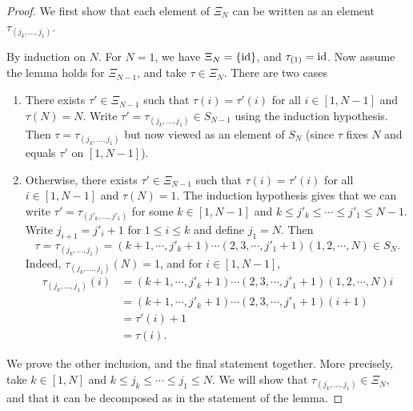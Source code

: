 \begin{proof}
	We first show that each element of $\Xi_N$ can be written as an element $\tau_{(j_k, \dots, j_1)}$.

	By induction on $N$. For $N = 1$, we have $\Xi_N = \{\operatorname{id}\}$, and $\tau_{(1)} = \operatorname{id}$.
	Now assume the lemma holds for $\Xi_{N-1}$, and take $\tau \in \Xi_N$. There are two
	cases
	\begin{enumerate}
		\item There exists $\tau' \in \Xi_{N-1}$ such that $\tau(i) = \tau'(i)$ for all $i\in [1,
				      N-1]$ and $\tau(N) = N$. Write $\tau' = \tau_{(j_k, \dots, j_1)} \in S_{N-1}$ using the
		      induction hypothesis. Then $\tau = \tau_{(j_k, \dots, j_1)}$ but now viewed as an
		      element of $S_N$ (since $\tau$ fixes $N$ and equals $\tau'$ on $[1, N-1]$).
		\item Otherwise, there exists $\tau' \in \Xi_{N-1}$ such that $\tau(i) = \tau'(i)$ for all
		      $i\in [1, N-1]$ and $\tau(N) = 1$. The induction hypothesis gives that we can write
		      $\tau' = \tau_{(j'_k, \dots, j'_1)}$ for some $k \in [1, N - 1]$ and $k \leq j'_k \leq
			      \cdots \leq j'_1 \leq N - 1$. Write $j_{i+1} = j'_i + 1$ for $1 \leq i \leq k$ and
		      define $j_1 = N$. Then
		      \begin{equation*}
			      \tau = \tau_{(j_k, \dots, j_1)} = (k+1, \cdots, j'_k + 1) \cdots (2, 3, \cdots ,j'_1 + 1)(1,2, \cdots, N) \in S_N.
		      \end{equation*}
		      Indeed, $\tau_{(j_k, \dots, j_1)}(N) = 1$, and for $i \in [1, N-1]$,
		      \begin{align*}
			      \tau_{(j_k, \dots, j_1)}(i)
			       & = (k+1, \cdots, j'_k + 1) \cdots (2, 3, \cdots, j'_1 + 1)(1,2, \cdots, N) i \\
			       & = (k+1, \cdots, j'_k + 1) \cdots (2, 3, \cdots, j'_1 + 1) (i+1)             \\
			       & = \tau'(i) + 1                                                              \\
			       & = \tau(i).
		      \end{align*}
	\end{enumerate}

	We prove the other inclusion, and the final statement together. More precisely, take $k
		\in [1, N]$ and $k \leq j_k \leq \dotsb \leq j_1 \leq N$. We will show that
	$\tau_{(j_k, \dotsc, j_1)} \in \Xi_N$, and that it can be decomposed as in the
	statement of the lemma.


\end{proof}
